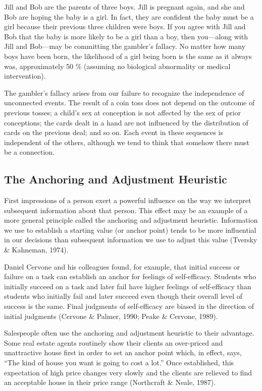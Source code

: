 \documentclass[
]{book}
\begin{document}
Jill and Bob are the parents of three boys. Jill is pregnant again, and she and Bob are hoping the baby is a girl. In fact, they are confident the baby must be a girl because their previous three children were boys. If you agree with Jill and Bob that the baby is more likely to be a girl than a boy, then you---along with Jill and Bob---may be committing the gambler's fallacy. No matter how many boys have been born, the likelihood of a girl being born is the same as it always was, approximately 50 \% (assuming no biological abnormality or medical intervention).

The gambler's fallacy arises from our failure to recognize the independence of unconnected events. The result of a coin toss does not depend on the outcome of previous tosses; a child's sex at conception is not affected by the sex of prior conceptions; the cards dealt in a hand are not influenced by the distribution of cards on the previous deal; and so on. Each event in these sequences is independent of the others, although we tend to think that somehow there must be a connection.

\hypertarget{the-anchoring-and-adjustment-heuristic}{%
\subsection*{The Anchoring and Adjustment Heuristic}\label{the-anchoring-and-adjustment-heuristic}}

First impressions of a person exert a powerful influence on the way we interpret subsequent information about that person. This effect may be an example of a more general principle called the anchoring and adjustment heuristic. Information we use to establish a starting value (or anchor point) tends to be more influential in our decisions than subsequent information we use to adjust this value (Tversky \& Kahneman, 1974).

Daniel Cervone and his colleagues found, for example, that initial success or failure on a task can establish an anchor for feelings of self-efficacy. Students who initially succeed on a task and later fail have higher feelings of self-efficacy than students who initially fail and later succeed even though their overall level of success is the same. Final judgments of self-efficacy are biased in the direction of initial judgments (Cervone \& Palmer, 1990; Peake \& Cervone, 1989).

Salespeople often use the anchoring and adjustment heuristic to their advantage. Some real estate agents routinely show their clients an over-priced and unattractive house first in order to set an anchor point which, in effect, says, ``The kind of house you want is going to cost a lot.'' Once established, this expectation of high price changes very slowly and the clients are relieved to find an acceptable house in their price range (Northcraft \& Neale, 1987).
\end{document}
